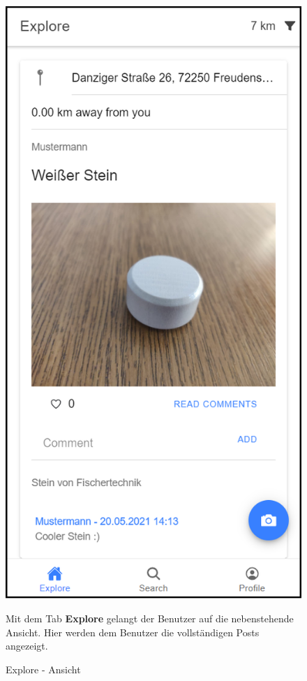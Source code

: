 \begin{figure}[H]
    \centering
    \begin{minipage}{.4\textwidth}
        \begin{center}
            \includegraphics[width=0.8\linewidth]{images/explore.png}
        \end{center}
        \caption{Explore - Ansicht}
        \label{fig:exploreTab}
    \end{minipage}%
    \begin{minipage}{.6\textwidth}
        \begin{changemargin}{0.5cm}{0cm}            
            Mit dem Tab \glqq \textbf{Explore}\grqq{} gelangt der Benutzer auf die nebenstehende Ansicht. Hier werden dem Benutzer die vollständigen Posts angezeigt.


\end{changemargin}
\end{minipage}
\end{figure}
